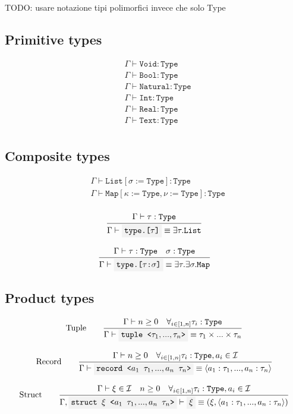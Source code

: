 \documentclass[11pt]{report}
\newcommand{\infrule}[3][gathered]{\frac{\begin{#1}#2\end{#1}}{\begin{gathered}#3\end{gathered}}}
\newcommand{\then}{\vdash}
\newcommand{\tuple}[1]{\left<#1\right>}
\newcommand{\code}[1]{\texttt{\colorbox{gray!10}{#1}}}
\newcommand{\Id}{\mathcal{I}}
\newcommand{\Type}{\texttt{Type}}
\newcommand{\Bool}{\texttt{Bool}}
\newcommand{\Text}{\texttt{Text}}
\newcommand{\Void}{\texttt{Void}}
\newcommand{\Int}{\texttt{Int}}
\newcommand{\Natural}{\texttt{Natural}}
\newcommand{\Real}{\texttt{Real}}
\newcommand{\List}{\texttt{List}}
\newcommand{\Map}{\texttt{Map}}
\newcommand{\Env}{\Gamma}
\theoremstyle{definition}
\newcommand{\comment}[1]{
	\parbox{0.9\linewidth}{\color{black!30}\small\sffamily #1}
}
\begin{document}
\comment{TODO: usare notazione tipi polimorfici invece che solo Type}

\subsection{Primitive types}

\[
	\begin{split}
		&\Env\then \Void:\Type \\
		&\Env\then \Bool:\Type \\
		&\Env\then \Natural:\Type \\
		&\Env\then \Int:\Type \\
		&\Env\then \Real:\Type \\
		&\Env\then \Text:\Type \\
	\end{split}
\]

\subsection{Composite types}

\[
	\begin{split}
		&\Env\then \List[\sigma:=\Type]:\Type \\
		&\Env\then \Map[\kappa:=\Type,\nu:=\Type]:\Type \\
	\end{split}
\]

\[
	\infrule{
		\Env\then \tau:\Type
	}{
		\Env\then \code{type.[$\tau$]} \equiv \exists\tau.\List
	}
\]

\[
	\infrule{
		\Env\then \tau:\Type \quad \sigma:\Type
	}{
		\Env\then \code{type.[$\tau$:$\sigma$]} \equiv \exists\tau.\exists\sigma.\Map
	}
\]

\subsection{Product types}

\[
	\text{Tuple}\qquad
	\infrule{
		\Env\then n \geq 0 \quad \forall_{i\in[1,n]}{\tau_i:\Type}
	}{
		\Env\then \code{tuple <$\tau_1,...,\tau_n$>} \equiv \tau_1 \times ... \times \tau_n
	}
\]

\[
	\text{Record}\qquad
	\infrule{
		\Env\then n \geq 0 \quad \forall_{i\in[1,n]}{\tau_i:\Type, a_i \in \Id}
	}{
		\Env\then \code{record <$a_1$ $\tau_1,...,a_n$ $\tau_n$>} \equiv \tuple{a_1:\tau_1, ..., a_n:\tau_n}
	}
\]

\[
	\text{Struct} \qquad
	\infrule{
		\Env\then \xi \in \Id \quad n \geq 0 \quad \forall_{i\in[1,n]}{\tau_i:\Type, a_i \in \Id}
	}{
		\Env,\code{struct $\xi$ <$a_1$ $\tau_1,...,a_n$ $\tau_n$>} \then \code{$\xi$} \equiv (\xi,\tuple{a_1:\tau_1,...,a_n:\tau_n})
	}
\]
\end{document}
